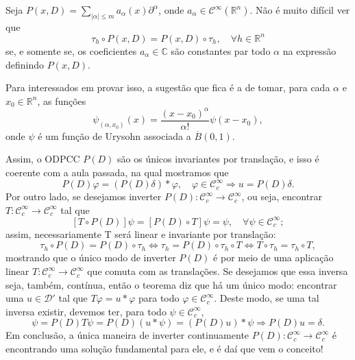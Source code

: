 \documentclass[../distribution_theory_notes.tex]{subfiles}
\begin{document}
\begin{tcolorbox}[
		skin=enhanced,
		title=Observação,
		fonttitle=\bfseries,
		colframe=black,
		colbacktitle=cyan!75!white,
		colback=cyan!15,
		colbacklower=black,
		coltitle=black,
		drop fuzzy shadow,
	]
	Seja \(P(x, D)=\sum\limits_{| \alpha  |\leq m}^{}a_{\alpha }(x)\partial^{\alpha }\), onde \(a_{\alpha }\in \mathcal{C}^{\infty}(\mathbb{R}^{n})\). Não é muito difícil ver que
	\[
		\tau_{h}\circ P(x, D) = P(x, D)\circ \tau_{h},\quad \forall h\in \mathbb{R}^{n}
	\]
	se, e somente se, os coeficientes \(a_{\alpha }\in \mathbb{C}\) são constantes par todo \(\alpha \) na expressão definindo \(P(x, D).\)

	Para interessados em provar isso, a sugestão que fica é a de tomar, para cada \(\alpha \) e \(x_{0}\in \mathbb{R}^{n}\), as funções
	\[
		\psi_{(\alpha , x_{0})}(x)= \frac{(x-x_{0})^{\alpha }}{ \alpha!}\psi (x-x_{0}),
	\]
	onde \(\psi \) é um função de Urysohn associada a \(\overline{B}(0,1)\).
\end{tcolorbox}

Assim, o ODPCC \(P(D)\) são os únicos invariantes por translação, e isso é coerente com a aula passada, na qual mostramos que
\[
	P(D)\varphi = (P(D)\delta )*\varphi ,\quad \varphi \in \mathcal{C}_{c}^{\infty} \Rightarrow u = P(D)\delta .
\]
Por outro lado, se desejamos inverter \(P(D):\mathcal{C}_{c}^{\infty}\rightarrow \mathcal{C}_{c}^{\infty}\), ou seja, encontrar \(T:\mathcal{C}_{c}^{\infty}\rightarrow \mathcal{C}_{c}^{\infty}\) tal que
\[
	[T \circ P(D)]\psi = [P(D)\circ T]\psi =\psi ,\quad \forall \psi \in \mathcal{C}_{c}^{\infty};
\]
assim, necessariamente T será linear e invariante por translação:
\[
	\tau_{h}\circ P(D)=P(D)\circ \tau_{h} \Longleftrightarrow \tau_{h} = P(D)\circ \tau_{h}\circ T \Longleftrightarrow T\circ \tau_{h}=\tau_{h}\circ T,
\]
mostrando que o único modo de inverter \(P(D)\) é por meio de uma aplicação linear \(T:\mathcal{C}_{c}^{\infty}\rightarrow \mathcal{C}_{c}^{\infty}\) que comuta com as translações.
Se desejamos que essa inversa seja, também, contínua, então o teorema diz que há um único modo: encontrar uma \(u\in \mathcal{D}'\) tal que \(T\varphi = u * \varphi \) para todo \(\varphi \in \mathcal{C}_{c}^{\infty}\).
Deste modo, se uma tal inversa existir, devemos ter, para todo \(\psi \in \mathcal{C}_{c}^{\infty}\),
\[
	\psi =P(D)T\psi = P(D)(u*\psi )=(P(D)u)*\psi \Rightarrow P(D)u = \delta .
\]
Em conclusão, a única maneira de inverter continuamente \(P(D):\mathcal{C}_{c}^{\infty}\rightarrow \mathcal{C}_{c}^{\infty}\) é encontrando uma solução fundamental para ele, e é daí que vem o conceito!
\end{document}
